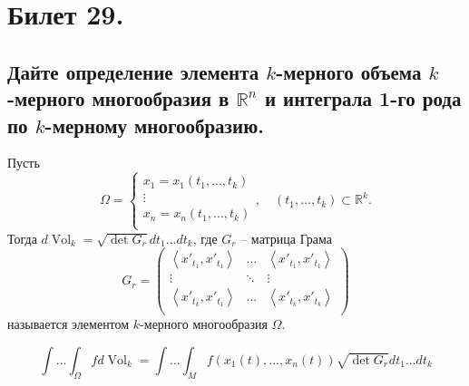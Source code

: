 \section{Билет 29.}

\subsection{Дайте определение элемента $k$-мерного объема $k$-мерного многообразия в $\mathbb{R}^n$ и интеграла 1-го рода по $k$-мерному многообразию.}
\begin{definition}
    Пусть
    \[
        \Omega = \begin{cases}
            x_1 = x_1 (t_1, ..., t_k) \\
            \vdots \\
            x_n = x_n (t_1, ..., t_k) \\
        \end{cases},
        \quad
        (t_1, ..., t_k) \subset \mathbb{R}^k.
    \]
    Тогда $d \operatorname{Vol}_k = \sqrt{\det G_r} dt_1 ...dt_k$, где $G_r$ -- матрица Грама
    \[
        G_r = \begin{pmatrix}
            \left< x'_{t_1}, x'_{t_1} \right>
            & ... &
            \left< x'_{t_1}, x'_{t_1} \right> \\
            \vdots & \ddots & \vdots \\
            \left< x'_{t_k}, x'_{t_1} \right>
            & ... &
            \left< x'_{t_k}, x'_{t_k} \right> \\
        \end{pmatrix}
    \]
    называется элементом $k$-мерного многообразия $\Omega$.
\end{definition}
\begin{definition}
    \[
        \int ... \int_\Omega f d \operatorname{Vol}_k =
        \int ... \int_M f(x_1(t), ..., x_n(t)) \sqrt{\det G_r} dt_1...dt_k
    \]
\end{definition}